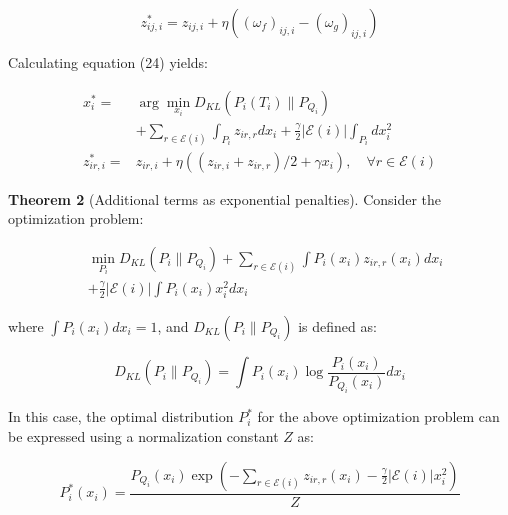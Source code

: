 \documentclass[a4paper,fleqn,10pt,twocolumn]{SICE_ISCS}
\begin{document}
\begin{equation}
z_{i j, i}^{*}=z_{i j, i}+\eta\left(\left(\omega_{f}\right)_{i j, i}-\left(\omega_{g}\right)_{i j, i}\right)
\end{equation}

Calculating equation (24) yields:

\begin{equation}
\begin{aligned}
x_{i}^{*}= & \arg \min _{x_{i}} D_{K L}\left(P_{i}\left(T_{i}\right) \| P_{Q_{i}}\right) \\
& +\sum_{r \in \mathcal{E}(i)} \int_{P_{i}} z_{i r, r} d x_{i}+\frac{\gamma}{2}|\mathcal{E}(i)| \int_{P_{i}} d x_{i}^{2} \\
z_{i r, i}^{*}= & z_{i r, i}+\eta\left(\left(z_{i r, i}+z_{i r, r}\right) / 2+\gamma x_{i}\right), \quad \forall r \in \mathcal{E}(i)
\end{aligned}
\end{equation}

\textbf{Theorem 2} (Additional terms as exponential penalties). Consider the optimization problem:

\begin{equation}
\begin{aligned}
& \min _{P_{i}} D_{K L}\left(P_{i} \| P_{Q_{i}}\right)+\sum_{r \in \mathcal{E}(i)} \int P_{i}\left(x_{i}\right) z_{i r, r}\left(x_{i}\right) d x_{i} \\
& +\frac{\gamma}{2}|\mathcal{E}(i)| \int P_{i}\left(x_{i}\right) x_{i}^{2} d x_{i}
\end{aligned}
\end{equation}

where $\int P_{i}\left(x_{i}\right) d x_{i}=1$, and $D_{K L}\left(P_{i} \| P_{Q_{i}}\right)$ is defined as:

\begin{equation}
D_{K L}\left(P_{i} \| P_{Q_{i}}\right)=\int P_{i}\left(x_{i}\right) \log \frac{P_{i}\left(x_{i}\right)}{P_{Q_{i}}\left(x_{i}\right)} d x_{i}
\end{equation}

In this case, the optimal distribution $P_{i}^{*}$ for the above optimization problem can be expressed using a normalization constant $Z$ as:

\begin{equation}
P_{i}^{*}\left(x_{i}\right)=\frac{P_{Q_{i}}\left(x_{i}\right) \exp \left(-\sum_{r \in \mathcal{E}(i)} z_{i r, r}\left(x_{i}\right)-\frac{\gamma}{2}|\mathcal{E}(i)| x_{i}^{2}\right)}{Z}
\end{equation}
\end{document}
